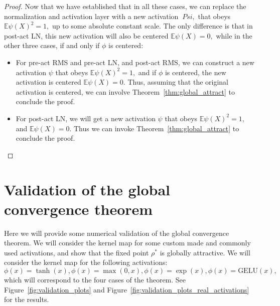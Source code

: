 \documentclass[twoside]{article}
\newcommand{\E}{\mathbb{E}}
\theoremstyle{definition}
\begin{document}
\begin{proof}
Now that we have established that in all these cases, we can replace the normalization and activation layer with a new activation $\ Psi,$ that obeys $\E \psi(X)^2 = 1,$ up to some absolute constant scale. The only difference is that in post-act LN, this new activation will also be centered $\E \psi(X) = 0,$ while in the other three cases, if and only if $\phi$ is centered:

\begin{itemize}
    \item For pre-act RMS and pre-act LN, and post-act RMS, we can construct a new activation $\psi$ that obeys $\E \psi(X)^2 = 1,$ and if $\phi$ is centered, the new activation is centered $\E \psi(X) = 0.$ Thus, assuming that the original activation is centered, we can involve Theorem~\ref{thm:global_attract} to conclude the proof.
    \item For post-act LN, we will get a new activation $\psi$ that obeys $\E \psi(X)^2 = 1,$ and $\E \psi(X) = 0.$ Thus we can invoke Theorem~\ref{thm:global_attract} to conclude the proof.
\end{itemize}
\end{proof}


\section{Validation of the global convergence theorem}
Here we will provide some numerical validation of the global convergence theorem. We will consider the kernel map for some custom made and commonly used activations, and show that the fixed point $\rho^*$ is globally attractive. We will consider the kernel map for the following activations: $\phi(x) = \tanh(x), \phi(x) = \max(0,x), \phi(x) = \exp(x), \phi(x) = \text{GELU}(x),$ which will correspond to the four cases of the theorem. See Figure~\ref{fig:validation_plots} and Figure~\ref{fig:validation_plots_real_activations} for the results.
\end{document}
